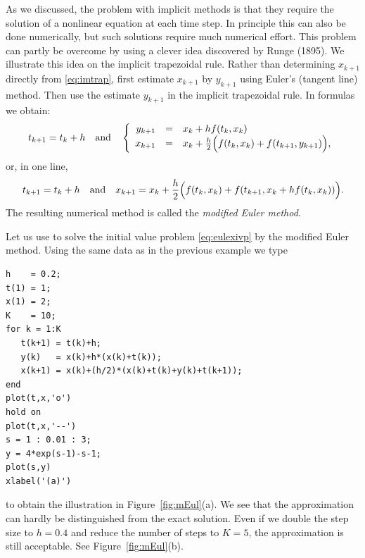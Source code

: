 \documentclass{ximera}
\begin{document}
As we discussed, the problem with implicit methods is that they require
the solution of a nonlinear equation at each time step.  In principle
this can also be done numerically, but such solutions 
require much numerical effort.  This problem can partly be overcome by 
using a clever idea discovered by {\sc Runge} (1895).  We illustrate 
this idea on the implicit trapezoidal rule.  Rather than determining 
$x_{k+1}$ directly from \eqref{eq:imtrap}, first estimate 
$x_{k+1}$ by $y_{k+1}$ using Euler's 
(tangent line) method.  Then use the estimate $y_{k+1}$ in the implicit 
trapezoidal rule.
In formulas we obtain:
\[
t_{k+1} = t_k+h \quad\mbox{and}\quad
\left\{\begin{array}{rcl}
y_{k+1} & = & x_k + h f(t_k, x_k)\\
x_{k+1} & = & x_k + \frac{h}{2}
\Big( f(t_k, x_k)+f(t_{k+1}, y_{k+1})\Big),
\end{array}\right.
\]
or, in one line,
\begin{equation}
\label{eq:meulmethod}
t_{k+1} = t_k+h \quad\mbox{and}\quad
x_{k+1} = x_k + \frac{h}{2}
\Big( f(t_k, x_k)+f(t_{k+1}, x_k + h f(t_k, x_k))\Big).
\end{equation}
The resulting numerical method is called the {\em modified Euler method}.
 

Let us use \Matlab to solve the initial value problem
\eqref{eq:eulexivp} by the modified Euler method.  
Using the same data as in the previous example we type
\begin{verbatim}
h    = 0.2;
t(1) = 1;
x(1) = 2;
K    = 10;
for k = 1:K
   t(k+1) = t(k)+h;
   y(k)   = x(k)+h*(x(k)+t(k));
   x(k+1) = x(k)+(h/2)*(x(k)+t(k)+y(k)+t(k+1));
end
plot(t,x,'o')
hold on
plot(t,x,'--')
s = 1 : 0.01 : 3;
y = 4*exp(s-1)-s-1;
plot(s,y)
xlabel('(a)')
\end{verbatim}
to obtain the illustration in Figure~\ref{fig:mEul}(a).
We see that the approximation can hardly be distinguished from
the exact solution.  Even if we double the step size 
to $h=0.4$ and reduce the number of steps to $K=5$, the 
approximation is still acceptable.  See Figure~\ref{fig:mEul}(b).
\end{document}
